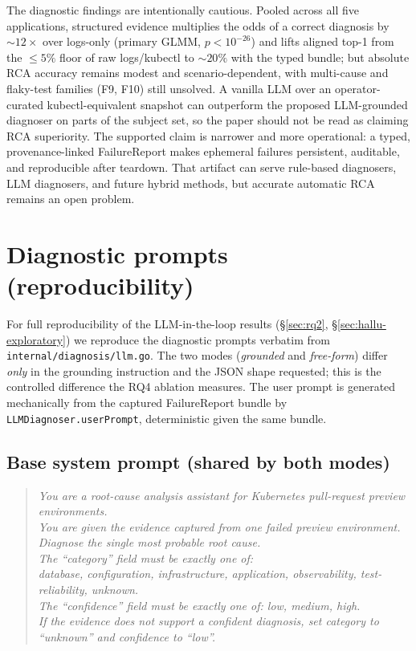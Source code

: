 \documentclass[sigconf, nonacm=true, anonymous=false, review=false]{acmart}
\newcommand{\artifactname}[1]{\nolinkurl{#1}}
\newcommand{\fp}{FailureReport\xspace}
\newcommand{\fn}[1]{F#1\xspace}
\begin{document}
The diagnostic findings are intentionally cautious. Pooled across all
five applications, structured evidence multiplies the odds of a correct
diagnosis by ${\sim}12\times$ over logs-only (primary GLMM, $p<10^{-26}$)
and lifts aligned top-1 from the ${\le}5\%$ floor of raw logs/kubectl to
${\sim}20\%$ with the typed bundle; but absolute RCA accuracy remains
modest and scenario-dependent, with multi-cause and flaky-test families
(\fn{9}, \fn{10}) still unsolved. A vanilla LLM over an operator-curated
kubectl-equivalent snapshot can outperform the proposed LLM-grounded
diagnoser on parts of the subject set, so the paper should not
be read as claiming RCA superiority. The supported claim is narrower and more
operational: a typed, provenance-linked \fp{} makes ephemeral failures
persistent, auditable, and reproducible after teardown. That artifact can
serve rule-based diagnosers, LLM diagnosers, and future hybrid methods, but
accurate automatic RCA remains an open problem.

\appendix

\section{Diagnostic prompts (reproducibility)}
\label{app:prompts}

For full reproducibility of the LLM-in-the-loop results
(§\ref{sec:rq2}, §\ref{sec:hallu-exploratory}) we reproduce the
diagnostic prompts verbatim from
\artifactname{internal/diagnosis/llm.go}. The two modes
(\emph{grounded} and \emph{free-form}) differ \emph{only} in the
grounding instruction and the JSON shape requested; this is the
controlled difference the RQ4 ablation measures. The user prompt
is generated mechanically from the captured \fp{} bundle by
\texttt{LLMDiagnoser.userPrompt}, deterministic given the same
bundle.

\subsection{Base system prompt (shared by both modes)}

\begin{quote}\small\itshape
You are a root-cause analysis assistant for Kubernetes pull-request
preview environments.\\
You are given the evidence captured from one failed preview
environment.\\
Diagnose the single most probable root cause.\\[0.3em]
The ``category'' field must be exactly one of:\\
database, configuration, infrastructure, application, observability,
test-reliability, unknown.\\
The ``confidence'' field must be exactly one of: low, medium, high.\\
If the evidence does not support a confident diagnosis, set category
to ``unknown'' and confidence to ``low''.
\end{quote}
\end{document}

